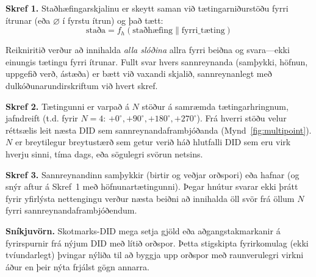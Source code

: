 \documentclass[11pt,a4paper,twocolumn]{article}
\begin{document}
\textbf{Skref 1.} Staðhæfingarskjalinu er skeytt saman við tætingarniðurstöðu fyrri ítrunar (eða $\varnothing$ í fyrstu ítrun) og það tætt:
\begin{equation}
\text{staða} = f_h(\text{staðhæfing} \| \text{fyrri\_tæting})
\label{eq:hash}
\end{equation}

Reikniritið verður að innihalda \emph{alla slóðina} allra fyrri beiðna og svara---ekki einungis tætingu fyrri ítrunar. Fullt svar hvers sannreynanda (samþykki, höfnun, uppgefið verð, ástæða) er bætt við vaxandi skjalið, sannreynanlegt með dulkóðunarundirskriftum við hvert skref.

\textbf{Skref 2.} Tætingunni er varpað á $N$ stöður á samræmda tætingarhringnum, jafndreift (t.d. fyrir $N=4$: $+0^{\circ}, +90^{\circ}, +180^{\circ}, +270^{\circ}$). Frá hverri stöðu velur réttsælis leit næsta DID sem sannreynandaframbjóðanda (Mynd~\ref{fig:multipoint}). $N$ er breytilegur breytustærð sem getur verið háð hlutfalli DID sem eru virk hverju sinni, tíma dags, eða sögulegri svörun netsins.

\textbf{Skref 3.} Sannreynandinn samþykkir (birtir og veðjar orðspori) eða hafnar (og snýr aftur á Skref~1 með höfnunartætingunni). Þegar hnútur svarar ekki þrátt fyrir yfirlýsta nettengingu verður næsta beiðni að innihalda öll svör frá öllum $N$ fyrri sannreynandaframbjóðendum.

\textbf{Sníkjuvörn.} Skotmarks-DID mega setja gjöld eða aðgangstakmarkanir á fyrirspurnir frá nýjum DID með lítið orðspor. Þetta stigskipta fyrirkomulag (ekki tvíundarlegt) þvingar nýliða til að byggja upp orðspor með raunverulegri virkni áður en þeir nýta frjálst gögn annarra.
\end{document}
